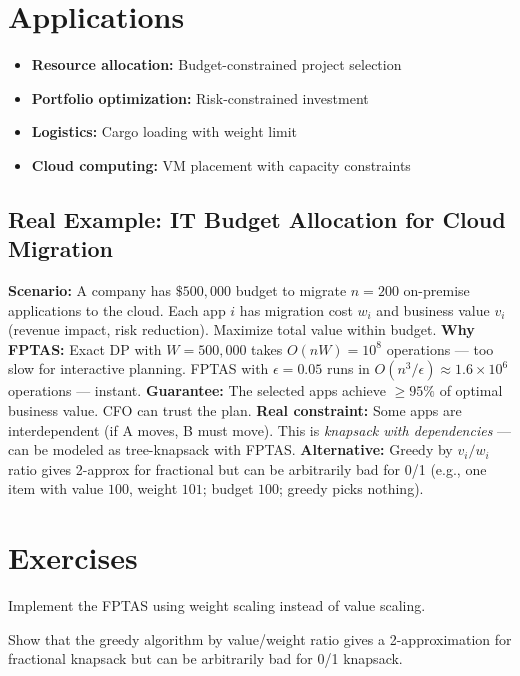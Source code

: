\section{Applications}
\begin{itemize}
    \item \textbf{Resource allocation:} Budget-constrained project selection
    \item \textbf{Portfolio optimization:} Risk-constrained investment
    \item \textbf{Logistics:} Cargo loading with weight limit
    \item \textbf{Cloud computing:} VM placement with capacity constraints
\end{itemize}

\subsection*{Real Example: IT Budget Allocation for Cloud Migration}
\textbf{Scenario:} A company has $\$500,000$ budget to migrate $n=200$ on-premise applications to the cloud. Each app $i$ has migration cost $w_i$ and business value $v_i$ (revenue impact, risk reduction). Maximize total value within budget.
\textbf{Why FPTAS:} Exact DP with $W=500,000$ takes $O(nW) = 10^8$ operations — too slow for interactive planning. FPTAS with $\epsilon=0.05$ runs in $O(n^3/\epsilon) \approx 1.6 \times 10^6$ operations — instant.
\textbf{Guarantee:} The selected apps achieve $\geq 95\%$ of optimal business value. CFO can trust the plan.
\textbf{Real constraint:} Some apps are interdependent (if A moves, B must move). This is \emph{knapsack with dependencies} — can be modeled as tree-knapsack with FPTAS.
\textbf{Alternative:} Greedy by $v_i/w_i$ ratio gives 2-approx for fractional but can be arbitrarily bad for 0/1 (e.g., one item with value $100$, weight $101$; budget $100$; greedy picks nothing).

\section{Exercises}
\begin{exercise}
Implement the FPTAS using weight scaling instead of value scaling.
\end{exercise}
\begin{exercise}
Show that the greedy algorithm by value/weight ratio gives a 2-approximation for fractional knapsack but can be arbitrarily bad for 0/1 knapsack.
\end{exercise}

